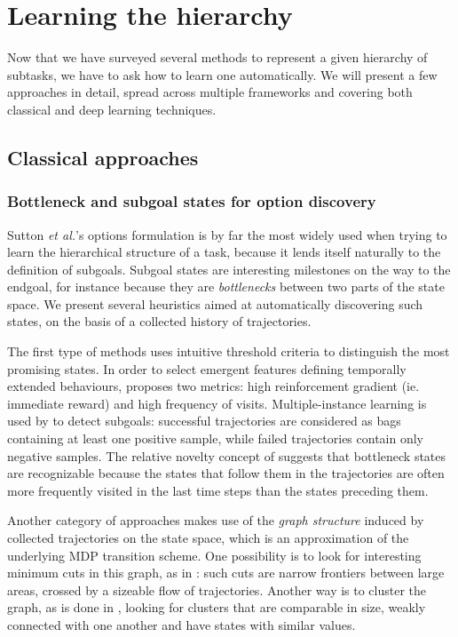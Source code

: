 \documentclass{article}
\newcommand{\etal}{\textit{et al.}}
\begin{document}
\section{Learning the hierarchy} \label{learning}

Now that we have surveyed several methods to represent a given hierarchy of subtasks, we have to ask how to learn one automatically. We will present a few approaches in detail, spread across multiple frameworks and covering both classical and deep learning techniques.

\subsection{Classical approaches}

\subsubsection{Bottleneck and subgoal states for option discovery}

Sutton \etal's options formulation \cite{sutton_between_1999} is by far the most widely used when trying to learn the hierarchical structure of a task, because it lends itself naturally to the definition of subgoals. Subgoal states are interesting milestones on the way to the endgoal, for instance because they are \textit{bottlenecks} between two parts of the state space. We present several heuristics aimed at automatically discovering such states, on the basis of a collected history of trajectories.

The first type of methods uses intuitive threshold criteria to distinguish the most promising states. In order to select emergent features defining temporally extended behaviours, \cite{digney_learning_1998} proposes two metrics: high reinforcement gradient (ie. immediate reward) and high frequency of visits. Multiple-instance learning is used by \cite{mcgovern_automatic_2001} to detect subgoals: successful trajectories are considered as bags containing at least one positive sample, while failed trajectories contain only negative samples. The relative novelty concept of \cite{simsek_using_2004} suggests that bottleneck states are recognizable because the states that follow them in the trajectories are often more frequently visited in the last time steps than the states preceding them.

Another category of approaches makes use of the \textit{graph structure} induced by collected trajectories on the state space, which is an approximation of the underlying MDP transition scheme. One possibility is to look for interesting minimum cuts in this graph, as in  \cite{goos_q-cutdynamic_2002}: such cuts are narrow frontiers between large areas, crossed by a sizeable flow of trajectories. Another way is to cluster the graph, as is done in \cite{mannor_dynamic_2004}, looking for clusters that are comparable in size, weakly connected with one another and have states with similar values.
\end{document}
